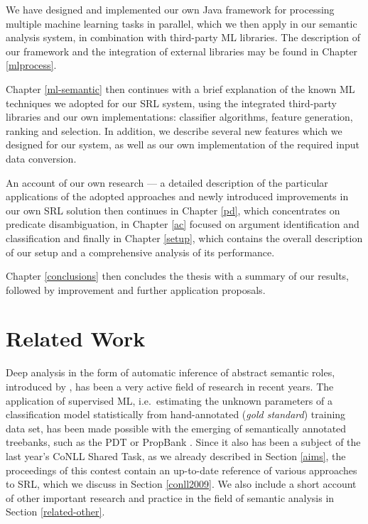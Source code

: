 \documentclass[12pt,notitlepage,a4paper]{report}
\begin{document}
We have designed and implemented our own Java framework for processing multiple machine learning tasks in parallel, which we then apply in our semantic analysis system, in combination with third-party ML libraries. The description of our framework and the integration of external libraries may be found in Chapter \ref{mlprocess}.

Chapter \ref{ml-semantic} then continues with a brief explanation of the known ML techniques we adopted for our SRL system, using the integrated third-party libraries and our own implementations: classifier algorithms, feature generation, ranking and selection. In addition, we describe several new features which we designed for our system, as well as our own implementation of the required input data conversion.

An account of our own research --- a detailed description of the particular applications of the adopted approaches and newly introduced improvements in our own SRL solution then continues in Chapter \ref{pd}, which concentrates on predicate disambiguation, in Chapter \ref{ac} focused on argument identification and classification and finally in Chapter \ref{setup}, which contains the overall description of our setup and a comprehensive analysis of its performance.

Chapter \ref{conclusions} then concludes the thesis with a summary of our results, followed by improvement and further application proposals.


%
%
\chapter{Related Work}\label{related}
%
%

Deep analysis in the form of automatic inference of abstract semantic roles, introduced by \citet{gildea02}, has been a very active field of research in recent years. The application of supervised ML, i.e.\ estimating the unknown parameters of a classification model statistically from hand-annotated (\emph{gold standard}) training data set, has been made possible with the emerging of semantically annotated treebanks, such as the PDT \citep{hajic06} or PropBank \citep{palmer05}. Since it also has been a subject of the last year's CoNLL Shared Task, as we already described in Section \ref{aims}, the proceedings of this contest contain an up-to-date reference of various approaches to SRL, which we discuss in Section \ref{conll2009}. We also include a short account of other important research and practice in the field of semantic analysis in Section \ref{related-other}.
\end{document}
